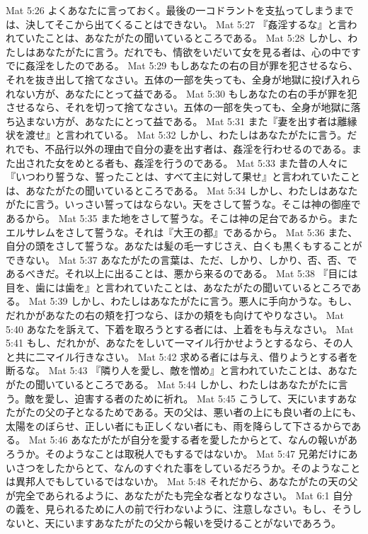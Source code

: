 Mat 5:26  よくあなたに言っておく。最後の一コドラントを支払ってしまうまでは、決してそこから出てくることはできない。
Mat 5:27  『姦淫するな』と言われていたことは、あなたがたの聞いているところである。
Mat 5:28  しかし、わたしはあなたがたに言う。だれでも、情欲をいだいて女を見る者は、心の中ですでに姦淫をしたのである。
Mat 5:29  もしあなたの右の目が罪を犯させるなら、それを抜き出して捨てなさい。五体の一部を失っても、全身が地獄に投げ入れられない方が、あなたにとって益である。
Mat 5:30  もしあなたの右の手が罪を犯させるなら、それを切って捨てなさい。五体の一部を失っても、全身が地獄に落ち込まない方が、あなたにとって益である。
Mat 5:31  また『妻を出す者は離縁状を渡せ』と言われている。
Mat 5:32  しかし、わたしはあなたがたに言う。だれでも、不品行以外の理由で自分の妻を出す者は、姦淫を行わせるのである。また出された女をめとる者も、姦淫を行うのである。
Mat 5:33  また昔の人々に『いつわり誓うな、誓ったことは、すべて主に対して果せ』と言われていたことは、あなたがたの聞いているところである。
Mat 5:34  しかし、わたしはあなたがたに言う。いっさい誓ってはならない。天をさして誓うな。そこは神の御座であるから。
Mat 5:35  また地をさして誓うな。そこは神の足台であるから。またエルサレムをさして誓うな。それは『大王の都』であるから。
Mat 5:36  また、自分の頭をさして誓うな。あなたは髪の毛一すじさえ、白くも黒くもすることができない。
Mat 5:37  あなたがたの言葉は、ただ、しかり、しかり、否、否、であるべきだ。それ以上に出ることは、悪から来るのである。
Mat 5:38  『目には目を、歯には歯を』と言われていたことは、あなたがたの聞いているところである。
Mat 5:39  しかし、わたしはあなたがたに言う。悪人に手向かうな。もし、だれかがあなたの右の頬を打つなら、ほかの頬をも向けてやりなさい。
Mat 5:40  あなたを訴えて、下着を取ろうとする者には、上着をも与えなさい。
Mat 5:41  もし、だれかが、あなたをしいて一マイル行かせようとするなら、その人と共に二マイル行きなさい。
Mat 5:42  求める者には与え、借りようとする者を断るな。
Mat 5:43  『隣り人を愛し、敵を憎め』と言われていたことは、あなたがたの聞いているところである。
Mat 5:44  しかし、わたしはあなたがたに言う。敵を愛し、迫害する者のために祈れ。
Mat 5:45  こうして、天にいますあなたがたの父の子となるためである。天の父は、悪い者の上にも良い者の上にも、太陽をのぼらせ、正しい者にも正しくない者にも、雨を降らして下さるからである。
Mat 5:46  あなたがたが自分を愛する者を愛したからとて、なんの報いがあろうか。そのようなことは取税人でもするではないか。
Mat 5:47  兄弟だけにあいさつをしたからとて、なんのすぐれた事をしているだろうか。そのようなことは異邦人でもしているではないか。
Mat 5:48  それだから、あなたがたの天の父が完全であられるように、あなたがたも完全な者となりなさい。
Mat 6:1  自分の義を、見られるために人の前で行わないように、注意しなさい。もし、そうしないと、天にいますあなたがたの父から報いを受けることがないであろう。
